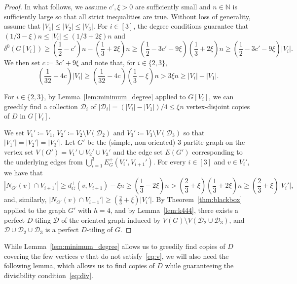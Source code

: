 \documentclass[11pt]{amsart}
\def\N{\mathbb{N}}
\newcommand{\D}{\mathcal{D}}
\begin{document}
\begin{proof}
    In what follows, we assume $c', \xi >0$ are sufficiently small and $n \in \N$ is sufficiently large so that all strict inequalities are true.  
    Without loss of generality, assume that $|V_1|\le |V_2|\le |V_3|$.
    For $i\in[3]$, the degree conditions guarantee that $(1/3 - \xi)n \le |V_i|\le (1/3 + 2\xi)n$ and 
    $$\delta^0(G[V_i])\ge 
    \left( \frac{1}{2} -c' \right)n - \left( \frac{1}{3} + 2\xi \right) n 
    \ge \left( \frac{1}{2} - 3c' - 9\xi \right) \left( \frac{1}{3} +2 \xi \right) n
    \ge \left( \frac{1}{2} - 3c' - 9\xi \right) |V_i|.$$ 
    We then set $c \coloneqq 3c'+9\xi$ and note that, for $i\in \{2,3\}$, 
    \begin{equation*}
        \left( \frac{1}{32}-4c \right)|V_{i}| \ge 
        \left( \frac{1}{32}-4c \right) \left( \frac{1}{3}-\xi \right)n > 
        3\xi n \ge |V_{i}|-|V_{1}|.
    \end{equation*}
    
    For $i\in \{2,3\}$, by Lemma~\ref{lem:minimum_degree} applied to $G[V_i]$, we can greedily find a collection $\D_i$ of $|\D_i| = (|V_i|-|V_{1}|)/4 \le \xi n$ vertex-disjoint copies of $D$ in $G[V_i]$.    

    We set $V_1' \coloneqq V_1$, $V_2' \coloneqq V_2 \setminus V(\D_2)$ and $V_3' \coloneqq V_3 \setminus V(\D_3)$ so that $|V_1'|=|V_2'|=|V_3'|$.  
    Let $G'$ be the (simple, non-oriented) $3$-partite graph on the vertex set $V(G') = V_1'\cup V_2' \cup V_3'$ and the edge set $E(G')$ corresponding to the underlying edges from $\bigcup_{i=1}^3 E^+_G(V_i', V_{i+1}')$. For every $i \in [3]$ and $v \in V_i'$, we have that 
    \begin{equation*}
        |N_{G'}(v) \cap V_{i+1}'| \ge d^+_G(v, V_{i+1}) - \xi n \ge 
        \left( \frac{1}{3}-2\xi \right) n > 
        \left( \frac{2}{3} + \xi \right) \left(\frac{1}{3}+2\xi\right)n \ge \left( \frac{2}{3} + \xi \right) |V_i'| ,
    \end{equation*}
    and, similarly, $|N_{G'}(v) \cap V_{i-1}'| \ge \left( \frac{2}{3} + \xi \right) |V_i'|$.
    By Theorem~\ref{thm:blackbox} applied to the graph $G'$ with $h=4$, and by Lemma~\ref{lem:k444}, there exists a perfect $D$-tiling $\D$ of the oriented graph induced by $V(G)\setminus V(\D_2\cup \D_3)$, and $\D\cup \D_2\cup \D_3$ is a perfect $D$-tiling of $G$.
\end{proof}

While Lemma~\ref{lem:minimum_degree} allows us to greedily find copies of $D$ covering the few vertices $v$ that do not satisfy~\eqref{eq:v}, we will also need the following lemma, which allows us to find copies of $D$ while guaranteeing the divisibility condition~\eqref{eq:div}. 
\end{document}
